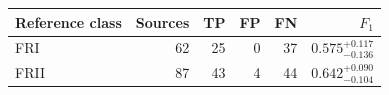 \begin{tabular}{@{}lrrrrr@{}}
\toprule
Reference class & Sources & TP & FP & FN & \(F_1\) \\
\midrule
FRI & 62 & 25 & 0 & 37 & \(0.575_{-0.136}^{+0.117}\) \\
FRII & 87 & 43 & 4 & 44 & \(0.642_{-0.104}^{+0.090}\) \\
\bottomrule
\end{tabular}
